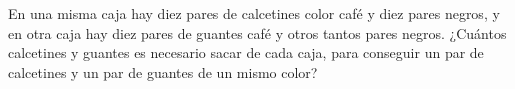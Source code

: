 En una misma caja hay diez pares de calcetines color café y diez pares negros, y en otra caja hay diez pares de guantes café y otros tantos pares negros. ¿Cuántos calcetines y guantes es necesario sacar de cada caja, para conseguir un par de calcetines y un par de guantes de un mismo color?
